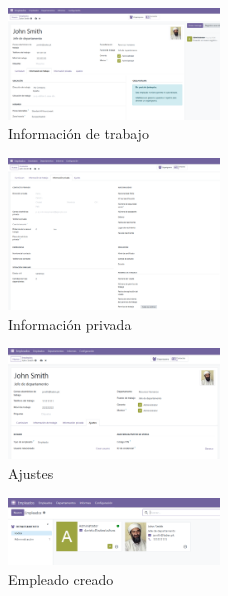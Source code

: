 \documentclass[a4paper,12pt]{article}
\begin{document}
\begin{figure}[h!]
    \centering
    \includegraphics[width=0.5\textwidth]{pr2odoo15-informacionDeTrabajo.png}
    \caption{Información de trabajo}
\end{figure}
\FloatBarrier

\begin{figure}[h!]
    \centering
    \includegraphics[width=0.5\textwidth]{pr2odoo16-informacionPrivada.png}
    \caption{Información privada}
\end{figure}
\FloatBarrier

\begin{figure}[h!]
    \centering
    \includegraphics[width=0.5\textwidth]{pr2odoo17-ajustes.png}
    \caption{Ajustes}
\end{figure}
\FloatBarrier

\begin{figure}[h!]
    \centering
    \includegraphics[width=0.5\textwidth]{pr2odoo18-empleadoCreado.png}
    \caption{Empleado creado}
\end{figure}
\FloatBarrier
\end{document}
